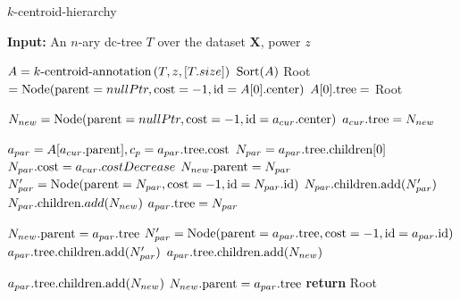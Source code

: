 \begin{algorithm}[h]
    \caption{$k$-centroid-hierarchy}\label{alg:k-centroid-hierarchy}
    \textbf{Input:} An $n$-ary dc-tree $T$ over the dataset $\mathbf{X}$, power $z$
    \begin{algorithmic}[1]
        \State $A = k\text{-centroid-annotation}\left( T, z, [T.size] \right)$
        \State $\text{Sort}(A)$
        \State Root $ = \text{Node}(\text{parent} = nullPtr, \text{cost} = -1, \text{id} = A[0].\text{center})$
        \State $A[0].\text{tree} = $ Root
        
            \State $N_{new} = \text{Node}(\text{parent} = nullPtr,\text{cost} = -1, \text{id} = a_{cur}.\text{center})$
            \State $a_{cur}.\text{tree} = N_{new}$

            \State $a_{par} = A[a_{cur}.\text{parent}], c_{p} = a_{par}.\text{tree}.\text{cost} $
             
                \State $N_{par} = a_{par}.\text{tree}.\text{children}[0]$ 
                \State $N_{par}.\text{cost} = a_{cur}.costDecrease$
                \State $N_{new}.\text{parent} = N_{par}$
                \State $N'_{par} = \text{Node}(\text{parent} = N_{par}, \text{cost} = -1, \text{id} = N_{par}.\text{id})$
                \State $N_{par}.\text{children}.\text{add}(N'_{par})$ 
                \State $N_{par}.\text{children}.add(N_{new})$
                \State $a_{par}.\text{tree} = N_{par}$ 
                
             
                \State $N_{new}.\text{parent} = a_{par}.\text{tree}$
                \State $N'_{par} = \text{Node}(\text{parent} = a_{par}.\text{tree}, \text{cost} = -1, \text{id} = a_{par}.\text{id})$
                \State $a_{par}.\text{tree}.\text{children}.\text{add}(N'_{par})$
                \State $a_{par}.\text{tree}.\text{children}.\text{add}(N_{new})$
                
            \Else {}
                \State $a_{par}.\text{tree}.\text{children}.\text{add}(N_{new})$
                \State $N_{new}.\text{parent} = a_{par}.\text{tree}$
            \EndIf
        \EndFor
        \State \textbf{return} Root
    \end{algorithmic}
\end{algorithm}


\newpage


